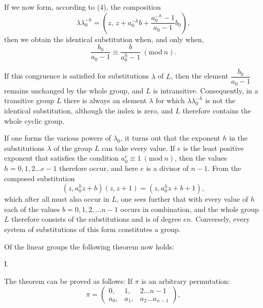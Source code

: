 
If we now form, according to (4), the composition
\[
\lambda \lambda_0^{-h} = \left(z,\, z + a_0^{-h} b + \frac{a_0^{-h} - 1}{a_0 - 1} b_0\right),
\]
then we obtain the identical substitution when, and only when,
\[
\frac{b_0}{a_0 - 1} \equiv \frac{b}{a_0^h - 1}\ (\mathrm{mod}\ n).
\]

If this congruence is satisfied for  substitutions $\lambda$ of $L$, then the element $\dfrac{b_0}{a_0 - 1}$ remains unchanged by the whole group, and $L$ is intransitive. Consequently, in a transitive group $L$ there is always an element $\lambda$ for which $\lambda \lambda_0^{-h}$ is not the identical substitution, although the index is zero, and $L$ therefore contains the whole cyclic group.

If one forms the various powers of $\lambda_0$, it turns out that the exponent $h$ in the substitutions $\lambda$ of the group $L$ can take every value. If $e$ is the least positive exponent that satisfies the condition $a_0^e \equiv 1\ (\mathrm{mod}\ n)$, then the values $h = 0, 1, 2 \ldots e - 1$ therefore occur, and here $e$ is a divisor of $n - 1$. From the composed substitution
\[
(z, a_0^h z + b)(z, z + 1) = (z, a_0^h z + b + 1),
\]
which after all must also occur in $L$, one sees further that with every value of $h$ each of the values $b = 0, 1, 2, \ldots n - 1$ occurs in combination, and the whole group $L$ therefore consists of the substitutions
and is of degree $en$. Conversely, every system of substitutions of this form constitutes a group.

Of the linear groups the following theorem now holds:

I. 

The theorem can be proved as follows:
If $\pi$ is an arbitrary permutation:
\[
\pi = \begin{pmatrix} 0, & 1, & 2 \ldots n - 1 \\ a_0, & a_1, & a_2 \ldots a_{n-1} \end{pmatrix},
\]
